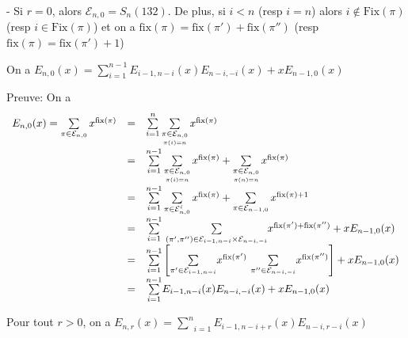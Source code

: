 - Si $r=0$, alors $\mathcal{E}_{n, 0} = S_{n}(132)$. De plus, si $i<n$ (resp $i=n$) alors $i\notin \text{Fix}(\pi)$ \\(resp $i \in \text{Fix}(\pi)$) et on a $\text{fix}(\pi) = \text{fix}(\pi') + \text{fix}(\pi'')$ (resp  $\text{fix}(\pi) = \text{fix}(\pi') + 1$)
\begin{proposition}\label{p8}
	On a $E_{n, 0}(x) = \sum\limits_{i=1}^{n-1}E_{i-1, n-i}(x)E_{n-i, -i}(x) + xE_{n-1, 0}(x)$
\end{proposition}
Preuve: On a
\[
	\begin{array}{l l l}
		E_{n, 0}(x) = \sum\limits_{\pi \in \mathcal{E}_{n, 0}}x^{\text{fix}(\pi)} & = & \sum\limits_{i=1}^{n} \sum\limits_{\underset{\pi(i)=n }{\pi \in \mathcal{E}_{n,0} }} x^{\text{fix}(\pi)}                                                                                                   \\
		                                                                   & = & \sum\limits_{i=1}^{n-1} \sum\limits_{\underset{\pi(i)=n }{\pi \in \mathcal{E}_{n,0} }} x^{\text{fix}(\pi)} + \sum\limits_{\underset{\pi(n)=n }{\pi \in \mathcal{E}_{n,0} }}x^{\text{fix}(\pi)}                    \\
		                                                                   & = & \sum\limits_{i=1}^{n-1} \sum\limits_{\pi \in \mathcal{E}_{n,0}^{i} } x^{\text{fix}(\pi)} + \sum\limits_{\pi \in \mathcal{E}_{n-1,0} }x^{\text{fix}(\pi)+1}                                                        \\
		                                                                   & = & \underset{i=1}{\overset{n-1}{\sum}} \text{ } \underset{(\pi', \pi'') \in \mathcal{E}_{i-1,n-i}\times \mathcal{E}_{n-i,-i}}{\sum}x^{\text{fix}(\pi') + \text{fix}(\pi'')} + xE_{n-1,0}(x)                          \\
		                                                                   & = & \underset{i=1}{\overset{n-1}{\sum}}\left[ \underset{\pi' \in \mathcal{E}_{i-1,n-i}}{\sum}x^{\text{fix}(\pi')}\text{ }\underset{\pi'' \in \mathcal{E}_{n-i,-i}}{\sum}x^{\text{fix}(\pi'')} \right] + xE_{n-1,0}(x) \\
		                                                                   & = & \underset{i=1}{\overset{n-1}{\sum}}E_{i-1,n-i}(x)E_{n-i,-i}(x) +  xE_{n-1,0}(x)
	\end{array}
\]
\begin{proposition}\label{p9}
	Pour tout $r>0$, on a $E_{n,r}(x) = \underset{i=1}{\overset{n}{\sum}}E_{i-1,n-i+r}(x)E_{n-i,r-i}(x)$
\end{proposition}
